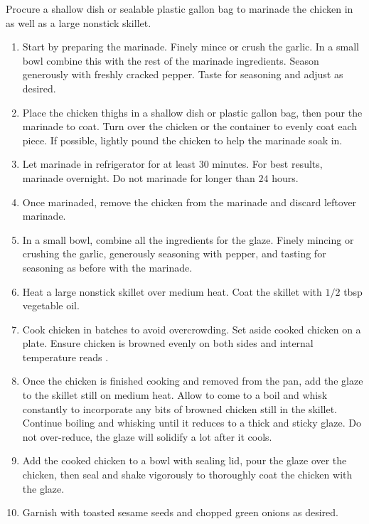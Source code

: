 \instructions
Procure a shallow dish or sealable plastic gallon bag to marinade the chicken in as well as a large nonstick skillet.
\begin{enumerate}
    \item Start by preparing the marinade. Finely mince or crush the garlic. In a small bowl combine this with the rest of the marinade ingredients. Season generously with freshly cracked pepper. Taste for seasoning and adjust as desired.
    \item Place the chicken thighs in a shallow dish or plastic gallon bag, then pour the marinade to coat. Turn over the chicken or the container to evenly coat each piece. If possible, lightly pound the chicken to help the marinade soak in.
    \item Let marinade in refrigerator for at least $30$ minutes. For best results, marinade overnight. Do not marinade for longer than $24$ hours.
    \item Once marinaded, remove the chicken from the marinade and discard leftover marinade.
    \item In a small bowl, combine all the ingredients for the glaze. Finely mincing or crushing the garlic, generously seasoning with pepper, and tasting for seasoning as before with the marinade.
    \item Heat a large nonstick skillet over medium heat. Coat the skillet with $1/2$ tbsp vegetable oil.
    \item Cook chicken in batches to avoid overcrowding. Set aside cooked chicken on a plate. Ensure chicken is browned evenly on both sides and internal temperature reads .
    \item Once the chicken is finished cooking and removed from the pan, add the glaze to the skillet still on medium heat. Allow to come to a boil and whisk constantly to incorporate any bits of browned chicken still in the skillet. Continue boiling and whisking until it reduces to a thick and sticky glaze. Do not over-reduce, the glaze will solidify a lot after it cools.
    \item Add the cooked chicken to a bowl with sealing lid, pour the glaze over the chicken, then seal and shake vigorously to thoroughly coat the chicken with the glaze.
    \item Garnish with toasted sesame seeds and chopped green onions as desired.
\end{enumerate}
\newpage
